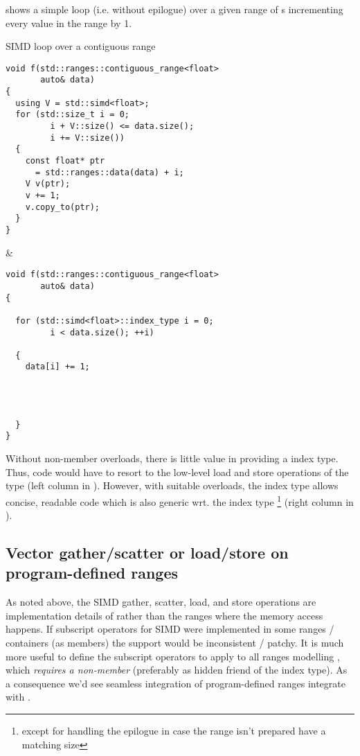  shows a simple loop (i.e. without epilogue) over a given range of s incrementing every value in the range by 1.
\begin{tonytable}{SIMD loop over a contiguous range}\label{tt:loadstore}
  \smaller\begin{lstlisting}
void f(std::ranges::contiguous_range<float>
       auto& data)
{
  using V = std::simd<float>;
  for (std::size_t i = 0;
         i + V::size() <= data.size();
         i += V::size())
  {
    const float* ptr
      = std::ranges::data(data) + i;
    V v(ptr);
    v += 1;
    v.copy_to(ptr);
  }
}
  \end{lstlisting}
  &
  \smaller\begin{lstlisting}
void f(std::ranges::contiguous_range<float>
       auto& data)
{

  for (std::simd<float>::index_type i = 0;
         i < data.size(); ++i)

  {
    data[i] += 1;




  }
}
  \end{lstlisting}
\end{tonytable}%
Without non-member  overloads, there is little value in providing a  index type.
Thus, code would have to resort to the low-level load and store operations of the  type (left column in ).
However, with suitable  overloads, the  index type allows concise, readable code which is also generic wrt. the index type%
\footnote{except for handling the epilogue in case the range isn't prepared have a matching size} (right column in ).


\subsection{Vector gather/scatter or load/store on program-defined ranges}
As noted above, the SIMD gather, scatter, load, and store operations are implementation details of  rather than the ranges where the memory access happens.
If subscript operators for SIMD were implemented in some ranges / containers (as members) the support would be inconsistent / patchy.
It is much more useful to define the subscript operators to apply to all ranges modelling , which \emph{requires a non-member } (preferably as hidden friend of the index type).
As a consequence we'd see seamless integration of program-defined ranges integrate with .

